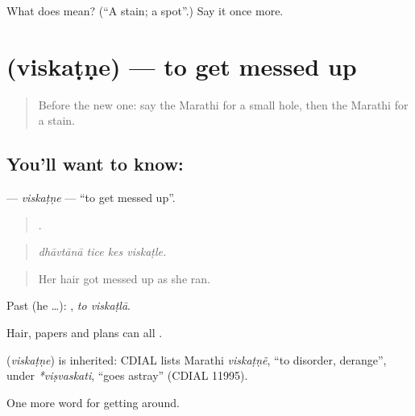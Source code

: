 \begin{tcolorbox}[breakable,colback=teal!4,colframe=teal!35!black,title={Before you move on}]
What does  mean? (\textquotedblleft{}A stain; a spot\textquotedblright{}.) Say it once more.
\end{tcolorbox}
\section[\texorpdfstring{\mr{विस्कटणे} (viskaṭṇe)}{विस्कटणे (viskaṭṇe)}]{ (viskaṭṇe) — to get messed up}

\label{lesson:MR-C432-viskatne}



\begin{quote}
Before the new one: say the Marathi for a small hole, then the Marathi for a stain.
\end{quote}

\subsection*{You'll want to know: }
\textbf{} — \emph{viskaṭṇe} — \textquotedblleft{}to get messed up\textquotedblright{}.

\begin{quote}
   .
\end{quote}

\begin{quote}
\emph{dhāvtānā tice kes viskaṭle.}
\end{quote}

\begin{quote}
Her hair got messed up as she ran.
\end{quote}

Past (he …):  , \emph{to viskaṭlā}.

Hair, papers and plans can all .

\begin{cousinweb}
\textbf{} (\emph{viskaṭṇe}) is inherited: CDIAL lists Marathi \emph{viskaṭṇẽ}, \textquotedblleft{}to disorder, derange\textquotedblright{}, under \emph{*viṣvaskati}, \textquotedblleft{}goes astray\textquotedblright{} (CDIAL 11995).
\end{cousinweb}

\begin{grammarlens}[title={What you've built}]
One more word for getting around.
\end{grammarlens}

